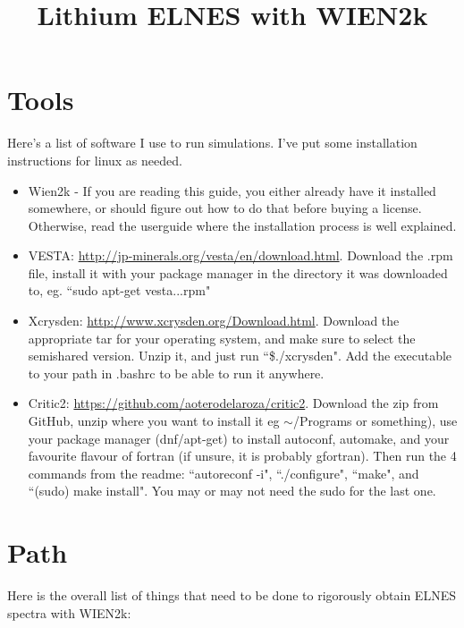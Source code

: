 \documentclass[12pt]{article}
\title{Lithium ELNES with WIEN2k}
\begin{document}
\maketitle

\tableofcontents

\section{Tools}	
Here's a list of software I use to run simulations.  I've put some installation instructions for linux as needed.  

\begin{itemize}
	\item Wien2k  - If you are reading this guide, you either already have it installed somewhere, or should figure out how to do that before buying a license.  Otherwise, read the userguide where the installation process is well explained. 
	
	\item  VESTA: \url{http://jp-minerals.org/vesta/en/download.html}.  Download the .rpm file, install it with your package manager in the directory it was downloaded to, eg. ``sudo apt-get vesta...rpm"
	
	\item Xcrysden: \url{http://www.xcrysden.org/Download.html}.  Download the appropriate tar for your operating system, and make sure to select the semishared version.  Unzip it, and just run ``\$./xcrysden".  Add the executable to your path in .bashrc to be able to run it anywhere.
	
	\item Critic2: \url{https://github.com/aoterodelaroza/critic2}.  Download the zip from GitHub, unzip where you want to install it eg $\sim$/Programs or something), use your package manager (dnf/apt-get) to install  autoconf, automake, and your favourite flavour of fortran (if unsure, it is probably gfortran).  Then run the 4 commands from the readme: ``autoreconf -i", ``./configure", ``make", and ``(sudo) make install".   You may or may not need the sudo for the last one. 
	
\end{itemize}
	
\section{Path}
Here is the overall list of things that need to be done to rigorously obtain ELNES spectra with WIEN2k:
\end{document}
